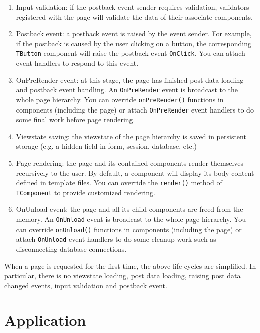 \documentclass{book}
\begin{document}
\begin{enumerate}
\item Input validation: if the postback event sender requires
validation, validators registered with the page will validate the
data of their associate components.

\item Postback event: a postback event is raised by the event
sender. For example, if the postback is caused by the user
clicking on a button, the corresponding \verb|TButton| component
will raise the postback event \verb|OnClick|. You can attach event
handlers to respond to this event.

\item OnPreRender event: at this stage, the page has finished post
data loading and postback event handling. An \verb|OnPreRender|
event is broadcast to the whole page hierarchy. You can override
\verb|onPreRender()| functions in components (including the page)
or attach \verb|OnPreRender| event handlers to do some final work
before page rendering.

\item Viewstate saving: the viewstate of the page hierarchy is
saved in persistent storage (e.g. a hidden field in form, session,
database, etc.)

\item Page rendering: the page and its contained components render
themselves recursively to the user. By default, a component will
display its body content defined in template files. You can
override the \verb|render()| method of \verb|TComponent| to
provide customized rendering.

\item OnUnload event: the page and all its child components are
freed from the memory. An \verb|OnUnload| event is broadcast to
the whole page hierarchy. You can override \verb|onUnload()|
functions in components (including the page) or attach
\verb|OnUnload| event handlers to do some cleanup work such as
disconnecting database connections.
\end{enumerate}

When a page is requested for the first time, the above life cycles
are simplified. In particular, there is no viewstate loading, post
data loading, raising post data changed events, input validation
and postback event.


\section{Application}
\end{document}
